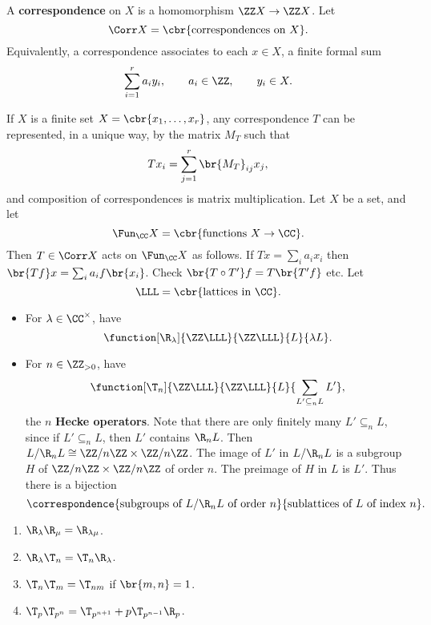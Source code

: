 \begin{definition}
A \textbf{correspondence} on $ X $ is a homomorphism $ \ZZ X \to \ZZ X $. Let
$$ \Corr X = \cbr{\text{correspondences on} \ X}. $$
Equivalently, a correspondence associates to each $ x \in X $, a finite formal sum
$$ \sum_{i = 1}^r a_iy_i, \qquad a_i \in \ZZ, \qquad y_i \in X. $$
\end{definition}

If $ X $ is a finite set $ X = \cbr{x_1, \dots, x_r} $, any correspondence $ T $ can be represented, in a unique way, by the matrix $ M_T $ such that
$$ Tx_i = \sum_{j = 1}^r \br{M_T}_{ij}x_j, $$
and composition of correspondences is matrix multiplication. Let $ X $ be a set, and let
$$ \Fun_\CC X = \cbr{\text{functions} \ X \to \CC}. $$
Then $ T \in \Corr X $ acts on $ \Fun_\CC X $ as follows. If $ Tx = \sum_i a_ix_i $ then $ \br{Tf}x = \sum_i a_if\br{x_i} $. Check $ \br{T \circ T'}f = T\br{T'f} $ etc. Let
$$ \LLL = \cbr{\text{lattices in} \ \CC}. $$

\pagebreak

\begin{example*}
\hfill
\begin{itemize}
\item For $ \lambda \in \CC^\times $, have
$$ \function[\R_\lambda]{\ZZ\LLL}{\ZZ\LLL}{L}{\lambda L}. $$
\item For $ n \in \ZZ_{> 0} $, have
$$ \function[\T_n]{\ZZ\LLL}{\ZZ\LLL}{L}{\sum_{L' \subseteq_n L} L'}, $$
the $ n $ \textbf{Hecke operators}. Note that there are only finitely many $ L' \subseteq_n L $, since if $ L' \subseteq_n L $, then $ L' $ contains $ \R_nL $. Then $ L / \R_nL \cong \ZZ / n\ZZ \times \ZZ / n\ZZ $. The image of $ L' $ in $ L / \R_nL $ is a subgroup $ H $ of $ \ZZ / n\ZZ \times \ZZ / n\ZZ $ of order $ n $. The preimage of $ H $ in $ L $ is $ L' $. Thus there is a bijection
$$ \correspondence{\text{subgroups of} \ L / \R_nL \ \text{of order} \ n}{\text{sublattices of} \ L \ \text{of index} \ n}. $$
\end{itemize}
\end{example*}

\begin{proposition}
\label{prop:correspondence}
\hfill
\begin{enumerate}
\item $ \R_\lambda\R_\mu = \R_{\lambda\mu} $.
\item $ \R_\lambda\T_n = \T_n\R_\lambda $.
\item $ \T_n\T_m = \T_{nm} $ if $ \br{m, n} = 1 $.
\item $ \T_p\T_{p^n} = \T_{p^{n + 1}} + p\T_{p^{n - 1}}\R_p $.
\end{enumerate}
\end{proposition}

